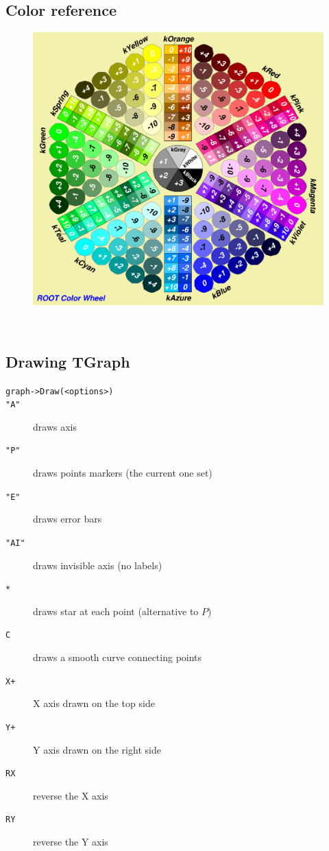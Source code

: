 \documentclass[10pt, oneside]{article}
\begin{document}
\subsection{Color reference}
\begin{figure}[h!]
\centering
\includegraphics[scale=0.25]{maxres.png}
\end{figure}
~\\
\subsection{Drawing TGraph}
\begin{description}
\item[\texttt{graph->Draw(<options>)}]
\item[\texttt{"A"}] draws axis
\item[\texttt{"P"}] draws points markers (the current one set)
\item[\texttt{"E"}] draws error bars
\item[\texttt{"AI"}] draws invisible axis (no labels)
\item[\texttt{*}] draws star at each point (alternative to $P$)
\item[\texttt{C}] draws a smooth curve connecting points
\item[\texttt{X+}] X axis drawn on the top side
\item[\texttt{Y+}] Y axis drawn on the right side
\item[\texttt{RX}] reverse the X axis
\item[\texttt{RY}] reverse the Y axis
\end{description}
\end{document}
